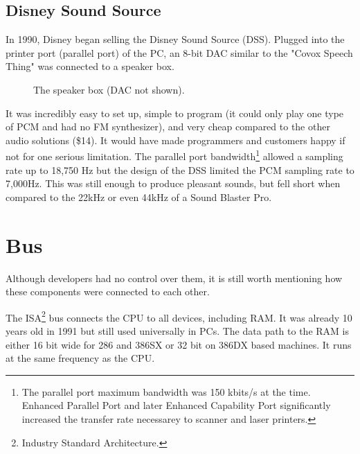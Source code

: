 \documentclass[book.tex]{subfiles}
\begin{document}
  \subsection{Disney Sound Source}
  In 1990, Disney began selling the Disney Sound Source (DSS). Plugged into the printer port (parallel port) of the PC, an 8-bit DAC similar to the "Covox Speech Thing" was connected to a speaker box. 
  \par
  \begin{figure}[H] 
    \centering 
    \caption{The speaker box (DAC not shown).}
  \end{figure}
\par
It was incredibly easy to set up, simple to program (it could only play one type of PCM and had no FM synthesizer), and very cheap compared to the other audio solutions (\$14). It would have made programmers and customers happy if not for one serious limitation. The parallel port bandwidth\footnote{The parallel port maximum bandwidth was 150 kbits/s at the time. Enhanced Parallel Port and later Enhanced Capability Port significantly increased the transfer rate necessarey to scanner and laser printers.} allowed a sampling rate up to 18,750 Hz but the design of the DSS limited the PCM sampling rate to 7,000Hz. This was still enough to produce pleasant sounds, but fell short when compared to the 22kHz or even 44kHz of a Sound Blaster Pro.









\section{Bus}
Although developers had no control over them, it is still worth mentioning how these components were connected to each other.\\ 
\par

The ISA\footnote{Industry Standard Architecture.} bus connects the CPU to all devices, including RAM. It was already 10 years old in 1991 but still used universally in PCs. The data path to the RAM is either 16 bit wide for 286 and 386SX or 32 bit on 386DX based machines. It runs at the same frequency as the CPU.\\
\par
\end{document}
